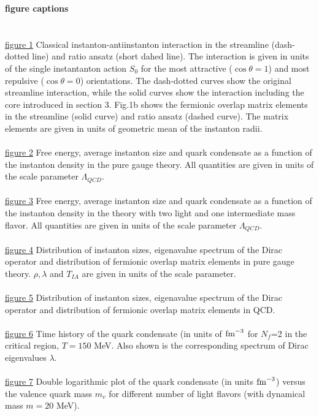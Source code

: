 \newpage\noindent
{\Large\bf figure captions}\\ \\ \\
\underline{figure 1} Classical instanton-antiinstanton interaction
in the streamline (dash-dotted line) and ratio ansatz (short dahed
line). The interaction is given in units of the single instantanton
action $S_0$ for the most attractive ($\cos\theta=1$) and most repulsive
($\cos\theta=0$) orientations. The dash-dotted curves show the original
streamline interaction, while the solid curves show the interaction
including the core introduced in section 3. Fig.1b shows the fermionic
overlap matrix elements in the streamline (solid curve) and ratio ansatz
(dashed curve). The matrix elements are given in units of geometric mean
of the instanton radii.
\\ \\
\underline{figure 2} Free energy, average instanton size and quark
condensate as a function of the instanton density in the pure gauge
theory. All quantities are given in units of the scale parameter
$\Lambda_{QCD}$.
\\ \\
\underline{figure 3} Free energy, average instanton size and quark
condensate as a function of the instanton density in the theory with
two light and one intermediate mass flavor. All quantities are given in units
of the scale parameter $\Lambda_{QCD}$.
\\ \\
\underline{figure 4} Distribution of instanton sizes, eigenavalue
spectrum of the Dirac operator and distribution of fermionic
overlap matrix elements in pure gauge theory. $\rho,\lambda$
and $T_{IA}$ are given in units of the scale parameter.
\\ \\
\underline{figure 5} Distribution of instanton sizes, eigenavalue
spectrum of the Dirac operator and distribution of fermionic
overlap matrix elements in QCD.
\\ \\
\underline{figure 6} Time history of the quark condensate (in units
of ${\rm fm}^{-3}$ for $N_f$=2 in the critical region, $T=150$ MeV.
Also shown is the corresponding spectrum of Dirac eigenvalues $\lambda$.
\\ \\
\underline{figure 7} Double logarithmic plot of the quark condensate
(in units ${\rm fm}^{-3}$) versus the valence quark mass $m_v$ for
different number of light flavors (with dynamical mass $m=20$ MeV).
